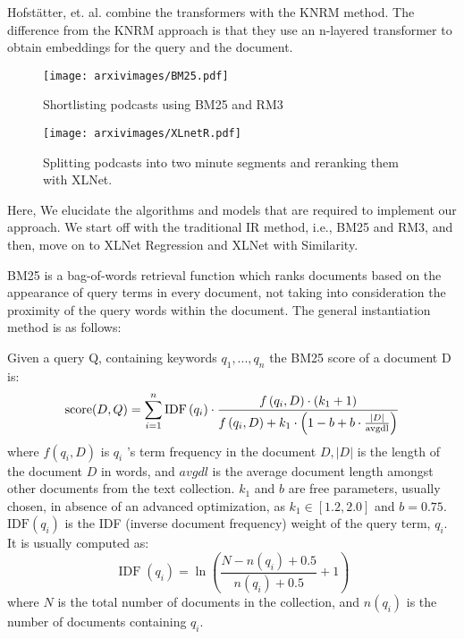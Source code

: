 \documentclass[10pt,twocolumn]{article}
\begin{document}
Hofstätter, et. al. \cite{SimpleContextualisation} combine the transformers with the KNRM method. The difference from the KNRM approach is that they use an n-layered transformer to obtain embeddings for the query and the document. 



\begin{figure}
    \texttt{[image: arxivimages/BM25.pdf]}
    \caption{Shortlisting podcasts using BM25 and RM3}
\end{figure}

\begin{figure*}
    \texttt{[image: arxivimages/XLnetR.pdf]}
    \caption{Splitting podcasts into two minute segments and reranking them with XLNet.}
\end{figure*}
Here, We elucidate the algorithms and models that are required to implement our approach. We start off with the traditional IR method, i.e., BM25 and RM3, and then, move on to XLNet Regression and XLNet with Similarity. 


BM25 \cite{bm25} is a bag-of-words retrieval function which ranks documents based on the appearance of query terms in every document, not taking into consideration the proximity of the query words within the document. The general instantiation method is as follows:

Given a query Q, containing keywords ${q_{1},...,q_{n}}$ the BM25 score of a document D is:
\begin{equation}
\operatorname{score}(D, Q)=\sum_{i=1}^{n} \operatorname{IDF}\left(q_{i}\right) \cdot \frac{f\left(q_{i}, D\right) \cdot\left(k_{1}+1\right)}{f\left(q_{i}, D\right)+k_{1} \cdot\left(1-b+b \cdot \frac{|D|}{\operatorname{avgdl}}\right)}\\
\end{equation}
where $f\left(q_{i}, D\right)$ is $q_{i}$ 's term frequency in the document $D,|D|$ is the length of the document $D$ in words, and $avgdl$ is the average document length amongst other documents from the text collection. $k_{1}$ and $b$ are free parameters, usually chosen, in absence of an advanced optimization, as $k_{1} \in[1.2,2.0]$ and $b=0.75$.  $\mathrm{IDF}\left(q_{i}\right)$ is the IDF (inverse document frequency) weight of the query term, $q_{i}$. It is usually computed as:
\begin{equation}
\operatorname{IDF}\left(q_{i}\right)=\ln \left(\frac{N-n\left(q_{i}\right)+0.5}{n\left(q_{i}\right)+0.5}+1\right)
\end{equation}
 where $N$ is the total number of documents in the collection, and $n(q_i)$ is the number of documents containing $q_i$.
\end{document}
